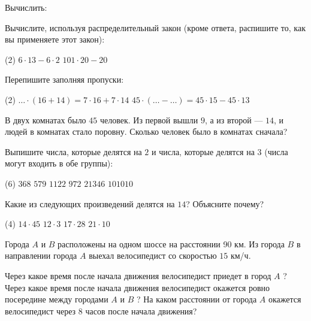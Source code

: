 \begin{exam}
	\begin{listofex}
	\item Вычислить:
	\begin{itasks}[1]
		\task {}
		\task {}
	\end{itasks}
	\item Вычислите, используя распределительный закон (кроме ответа, распишите то, как вы применяете этот закон):
	\begin{tasks}(2)
		\task \( 6\cdot13-6\cdot2 \)
		\task \( 101\cdot20-20 \)
	\end{tasks}
	\item Перепишите заполняя пропуски:
	\begin{tasks}(2)
		\task \( {\dots}\cdot(16+14)=7\cdot16+7\cdot14 \)
		\task \( 45\cdot({\dots}-{\dots})=45\cdot15-45\cdot13 \)
	\end{tasks}
	\item В двух комнатах было \( 45 \) человек. Из первой вышли \( 9 \), а из второй --- \( 14 \), и людей в комнатах стало поровну. Сколько человек было в комнатах сначала?
	\item Выпишите числа, которые делятся на \( 2 \) и числа, которые делятся на \( 3 \) (числа могут входить в обе группы):
	\begin{tasks}(6)
		\task \( 368 \)
		\task \( 579 \)
		\task \( 1122 \)
		\task \( 972 \)
		\task \( 21346\)
		\task \( 101010 \)
	\end{tasks}
	\item Какие из следующих произведений делятся на \( 14 \)? Объясните почему?
	\begin{tasks}(4)
		\task \( 14\cdot45 \)
		\task \( 12\cdot3 \)
		\task \( 17\cdot28 \)
		\task \( 21\cdot10 \)
	\end{tasks}
	\item Города \( A \) и \( B \) расположены на одном шоссе на расстоянии 90 км. Из города \( B \) в
	направлении города \( A \) выехал велосипедист со скоростью \( 15 \) км/ч.
	\begin{tasks}
		\task Через какое время после начала движения велосипедист приедет в город \( A \) ?
		\task Через какое время после начала движения велосипедист окажется ровно посередине между
		городами \( A \) и \( B \) ?
		\task  На каком расстоянии от города \( A \) окажется велосипедист через 8 часов после начала
		движения?
	\end{tasks}
	\end{listofex}
\end{exam}

